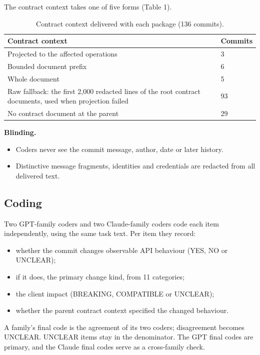 \documentclass[conference]{IEEEtran}
\begin{document}
The contract context takes one of five forms (Table 1).

\begin{table}[t]
\caption{Contract context delivered with each package (136 commits).}
\footnotesize
\begin{tabularx}{\linewidth}{Xl}
\toprule
Contract context & Commits \\
\midrule
Projected to the affected operations & 3 \\
Bounded document prefix & 6 \\
Whole document & 5 \\
Raw fallback: the first 2,000 redacted lines of the root contract documents, used when projection failed & 93 \\
No contract document at the parent & 29 \\
\bottomrule
\end{tabularx}
\end{table}

\textbf{Blinding.}
\begin{itemize}
\item Coders never see the commit message, author, date or later history.
\item Distinctive message fragments, identities and credentials are redacted from all delivered text.
\end{itemize}

\subsection{Coding}
Two GPT-family coders and two Claude-family coders code each item independently, using the same task text. Per item they record:
\begin{itemize}
\item whether the commit changes observable API behaviour (YES, NO or UNCLEAR);
\item if it does, the primary change kind, from 11 categories;
\item the client impact (BREAKING, COMPATIBLE or UNCLEAR);
\item whether the parent contract context specified the changed behaviour.
\end{itemize}

A family's final code is the agreement of its two coders; disagreement becomes UNCLEAR. UNCLEAR items stay in the denominator. The GPT final codes are primary, and the Claude final codes serve as a cross-family check.
\end{document}
